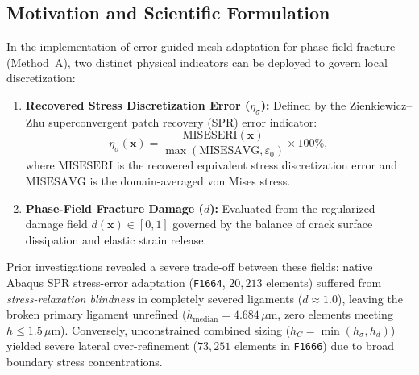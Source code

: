 \subsection{Motivation and Scientific Formulation}
In the implementation of error-guided mesh adaptation for phase-field fracture (Method~A), two distinct physical indicators can be deployed to govern local discretization:
\begin{enumerate}
  \item \textbf{Recovered Stress Discretization Error ($\eta_\sigma$):} Defined by the Zienkiewicz--Zhu superconvergent patch recovery (SPR) error indicator:
  \begin{equation}
    \eta_\sigma(\mathbf{x}) = \frac{\text{MISESERI}(\mathbf{x})}{\max\left(\text{MISESAVG}, \varepsilon_0\right)} \times 100\%,
    \label{eq:miseseri_rel_def}
  \end{equation}
  where $\text{MISESERI}$ is the recovered equivalent stress discretization error and $\text{MISESAVG}$ is the domain-averaged von Mises stress.
  \item \textbf{Phase-Field Fracture Damage ($d$):} Evaluated from the regularized damage field $d(\mathbf{x}) \in [0, 1]$ governed by the balance of crack surface dissipation and elastic strain release.
\end{enumerate}

Prior investigations revealed a severe trade-off between these fields: native Abaqus SPR stress-error adaptation (\texttt{F1664}, $20{,}213$ elements) suffered from \emph{stress-relaxation blindness} in completely severed ligaments ($d \approx 1.0$), leaving the broken primary ligament unrefined ($h_{\text{median}} = 4.684\,\mu\mathrm{m}$, zero elements meeting $h \le 1.5\,\mu\mathrm{m}$). Conversely, unconstrained combined sizing ($h_C = \min(h_\sigma, h_d)$) yielded severe lateral over-refinement ($73{,}251$ elements in \texttt{F1666}) due to broad boundary stress concentrations.

